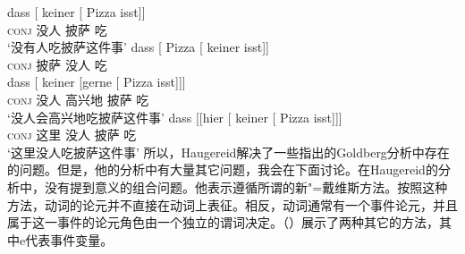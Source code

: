 \begin{exe}
\begin{xlist}[iv.]
\begin{exe}
\begin{xlist}[iv.]
\eal
\ex 
\gll dass [ keiner [ Pizza isst]]\\
     \textsc{conj} {} 没人 {} 披萨 吃\\
\glt `没有人吃披萨这件事'
\ex 
\gll dass [ Pizza [ keiner isst]]\\
	 \textsc{conj} {} 披萨 {} 没人 吃\\
\ex 
\gll dass [ keiner [gerne [ Pizza isst]]]\\
	 \textsc{conj} {} 没人 \spacebr{}高兴地 {} 披萨 吃\\
\glt `没人会高兴地吃披萨这件事'
\ex 
\gll dass [[hier              [ keiner [ Pizza isst]]]\\
     \textsc{conj} \hspaceThis{[[}这里 {}          没人 {} 披萨 吃\\
\glt `这里没人吃披萨这件事'
\zl
所以，Haugereid解决了一些指出的Goldberg分析中存在的问题。但是，他的分析中有大量其它问题，我会在下面讨论。在Haugereid的分析中，没有提到意义的组合问题。他表示遵循所谓的新"=戴维斯方法。按照这种方法，动词的论元并不直接在动词上表征。相反，动词通常有一个事件论元，并且属于这一事件的论元角色由一个独立的谓词决定。（）展示了两种其它的方法，其中e代表事件变量。

\end{xlist}
\end{exe}
\end{xlist}
\end{exe}
